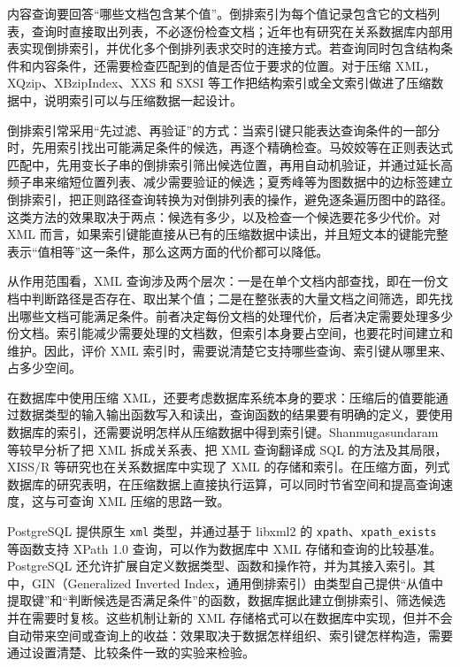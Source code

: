 内容查询要回答“哪些文档包含某个值”。倒排索引为每个值记录包含它的文档列表，查询时直接取出列表，不必逐份检查文档\cite{zobel2006inverted}；近年也有研究在关系数据库内部用表实现倒排索引，并优化多个倒排列表求交时的连接方式\cite{shin2022join}。若查询同时包含结构条件和内容条件，还需要检查匹配到的值是否位于要求的位置。对于压缩 XML，XQzip、XBzipIndex、XXS 和 SXSI 等工作把结构索引或全文索引做进了压缩数据中\cite{cheng2004xqzip,ferragina2006compressing,brisaboa2014xxs,arroyuelo2015fast}，说明索引可以与压缩数据一起设计。

倒排索引常采用“先过滤、再验证”的方式：当索引键只能表达查询条件的一部分时，先用索引找出可能满足条件的候选，再逐个精确检查。马姣姣等在正则表达式匹配中，先用变长子串的倒排索引筛出候选位置，再用自动机验证，并通过延长高频子串来缩短位置列表、减少需要验证的候选\cite{ma2025vgram}；夏秀峰等为图数据中的边标签建立倒排索引，把正则路径查询转换为对倒排列表的操作，避免逐条遍历图中的路径\cite{xia2024rpq}。这类方法的效果取决于两点：候选有多少，以及检查一个候选要花多少代价。对 XML 而言，如果索引键能直接从已有的压缩数据中读出，并且短文本的键能完整表示“值相等”这一条件，那么这两方面的代价都可以降低。

从作用范围看，XML 查询涉及两个层次：一是在单个文档内部查找，即在一份文档中判断路径是否存在、取出某个值；二是在整张表的大量文档之间筛选，即先找出哪些文档可能满足条件。前者决定每份文档的处理代价，后者决定需要处理多少份文档。索引能减少需要处理的文档数，但索引本身要占空间，也要花时间建立和维护。因此，评价 XML 索引时，需要说清楚它支持哪些查询、索引键从哪里来、占多少空间。

在数据库中使用压缩 XML，还要考虑数据库系统本身的要求：压缩后的值要能通过数据类型的输入输出函数写入和读出，查询函数的结果要有明确的定义，要使用数据库的索引，还需要说明怎样从压缩数据中得到索引键。Shanmugasundaram 等较早分析了把 XML 拆成关系表、把 XML 查询翻译成 SQL 的方法及其局限\cite{shanmugasundaram1999relational}，XISS/R 等研究也在关系数据库中实现了 XML 的存储和索引\cite{harding2003xissr}。在压缩方面，列式数据库的研究表明，在压缩数据上直接执行运算，可以同时节省空间和提高查询速度\cite{abadi2006integrating}，这与可查询 XML 压缩的思路一致。

PostgreSQL 提供原生 \texttt{xml} 类型，并通过基于 libxml2 的 \texttt{xpath}、\texttt{xpath\_exists} 等函数支持 XPath 1.0 查询\cite{pg16xmltype,pg16xmlfunc}，可以作为数据库中 XML 存储和查询的比较基准。PostgreSQL 还允许扩展自定义数据类型、函数和操作符，并为其接入索引。其中，GIN（Generalized Inverted Index，通用倒排索引）由类型自己提供“从值中提取键”和“判断候选是否满足条件”的函数，数据库据此建立倒排索引、筛选候选并在需要时复核\cite{pg16gin}。这些机制让新的 XML 存储格式可以在数据库中实现，但并不会自动带来空间或查询上的收益：效果取决于数据怎样组织、索引键怎样构造，需要通过设置清楚、比较条件一致的实验来检验。

